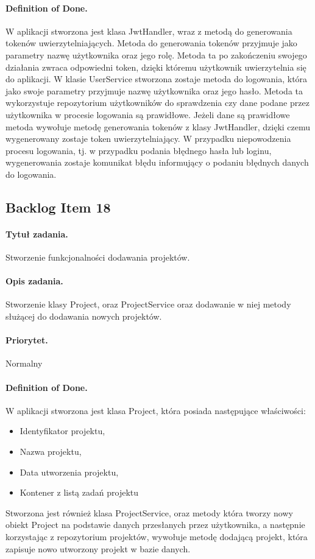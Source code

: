 ﻿\documentclass[a4paper]{article}
\begin{document}
\paragraph{Definition of Done.} W aplikacji stworzona jest klasa JwtHandler, wraz z metodą do generowania tokenów uwierzytelniających. Metoda do generowania tokenów przyjmuje jako parametry nazwę użytkownika oraz jego rolę. Metoda ta po zakończeniu swojego działania zwraca odpowiedni token, dzięki któremu użytkownik uwierzytelnia się do aplikacji. W klasie UserService stworzona zostaje metoda do logowania, która jako swoje parametry przyjmuje nazwę użytkownika oraz jego hasło. Metoda ta wykorzystuje repozytorium użytkowników do sprawdzenia czy dane podane przez użytkownika w procesie logowania są prawidłowe. Jeżeli dane są prawidłowe metoda wywołuje metodę generowania tokenów z klasy JwtHandler, dzięki czemu wygenerowany zostaje token uwierzytelniający. W przypadku niepowodzenia procesu logowania, tj. w przypadku podania błędnego hasła lub loginu, wygenerowania zostaje komunikat błędu informujący o podaniu błędnych danych do logowania.

\subsection{Backlog Item 18} 
\paragraph{Tytuł zadania.}  Stworzenie funkcjonalności dodawania projektów.
\paragraph{Opis zadania.} Stworzenie klasy Project, oraz ProjectService oraz dodawanie w niej metody służącej do dodawania nowych projektów. 
\paragraph{Priorytet.} Normalny
\paragraph{Definition of Done.} W aplikacji stworzona jest klasa Project, która posiada następujące właściwości:
\begin{itemize}
\item Identyfikator projektu, 
\item Nazwa projektu, 
\item Data utworzenia projektu,
\item Kontener z listą zadań projektu
\end{itemize}
Stworzona jest również klasa ProjectService, oraz metody która tworzy nowy obiekt Project na podstawie danych przesłanych przez użytkownika, a następnie korzystając z repozytorium projektów, wywołuje metodę dodającą projekt, która zapisuje nowo utworzony projekt w bazie danych. 
\end{document}

